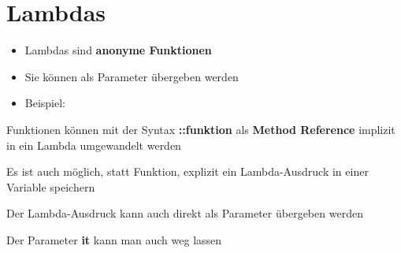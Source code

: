     \section{Lambdas}\label{sec:lambdas}
    \begin{frame}[c]
        \slidehead
    \end{frame}


    \begin{frame}[c]
        \slidehead
        \begin{itemize}
            [<+->]
            \item Lambdas sind \textbf{anonyme Funktionen}
            \item Sie können als Parameter übergeben werden
            \item Beispiel: 
        \end{itemize}
    \end{frame}

    \begin{frame}[c]
        \slidehead
        Funktionen können mit der Syntax \textbf{::funktion} als \textbf{Method Reference} implizit in ein Lambda umgewandelt werden
        \pause
    \end{frame}

    \begin{frame}[c]
        \slidehead
        Es ist auch möglich, statt Funktion, explizit ein Lambda-Ausdruck in einer Variable speichern
        \pause
    \end{frame}

    \begin{frame}[c]
        \slidehead
        Der Lambda-Ausdruck kann auch direkt als Parameter übergeben werden
        \pause
    \end{frame}

    \begin{frame}[c]
        \slidehead
        Der Parameter \textbf{it} kann man auch weg lassen
        \pause
    \end{frame}


